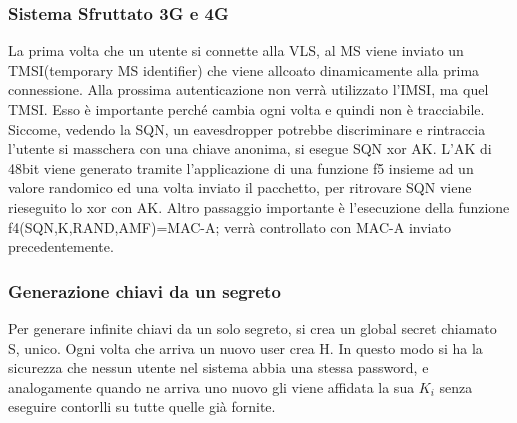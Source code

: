 \documentclass{article}
\theoremstyle{remark}
\begin{document}
\subsubsection{Sistema Sfruttato 3G e 4G}
La prima volta che un utente si connette alla VLS, al MS viene inviato un TMSI(temporary MS identifier) che viene allcoato dinamicamente alla prima connessione. Alla prossima autenticazione non verrà utilizzato l'IMSI, ma quel TMSI. Esso è importante perché cambia ogni volta e quindi non è tracciabile. Siccome, vedendo la SQN, un eavesdropper potrebbe discriminare e rintraccia l'utente si masschera con una chiave anonima, si esegue SQN xor AK.
L'AK di 48bit viene generato tramite l'applicazione di una funzione f5 insieme ad un valore randomico ed una volta inviato il pacchetto, per ritrovare SQN viene rieseguito lo xor con AK. Altro passaggio importante è l'esecuzione della funzione f4(SQN,K,RAND,AMF)=MAC-A; verrà controllato con MAC-A inviato precedentemente.
\subsubsection{Generazione chiavi da un segreto}
Per generare infinite chiavi da un solo segreto, si crea un global secret chiamato S, unico. Ogni volta che arriva un nuovo user crea H. In questo modo si ha la sicurezza che nessun utente nel sistema abbia una stessa password, e analogamente quando ne arriva uno nuovo gli viene affidata la sua $K_i$ senza eseguire contorlli su tutte quelle già fornite.
\end{document}
